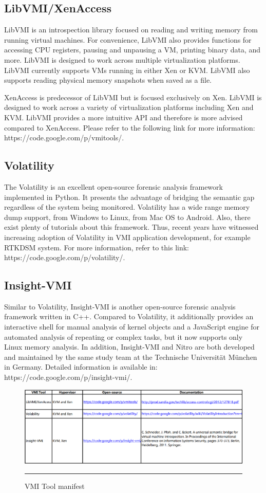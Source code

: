 \subsection{LibVMI/XenAccess  \cite{Reference10,Reference11}}

LibVMI is an introspection library focused on reading and writing memory from running virtual machines. For convenience, LibVMI also provides 
functions for accessing CPU registers, pausing and unpausing a VM, printing binary data, and more. LibVMI is designed to work across multiple 
virtualization platforms. LibVMI currently supports VMs running in either Xen or KVM. LibVMI also supports reading physical memory snapshots 
when saved as a file.

XenAccess is predecessor of LibVMI but is focused exclusively on Xen. LibVMI is designed to work across a variety of virtualization platforms
including Xen and KVM. LibVMI provides a more intuitive API and therefore is more advised compared to XenAccess. Please refer to the following
link for more information: https://code.google.com/p/vmitools/. 

\subsection{Volatility  \cite{Reference13}}

The Volatility is an excellent open-source forensic analysis framework implemented in Python. It presents the advantage of bridging the 
semantic gap regardless of the system being monitored. Volatility has a wide range memory dump support, from Windows to Linux, from Mac OS
to Android. Also, there exist plenty of tutorials about this framework. Thus, recent years have witnessed increasing adoption of Volatility
in VMI application development, for example RTKDSM system. For more information, refer to this link: https://code.google.com/p/volatility/.

\subsection{Insight-VMI  \cite{Reference14,Reference15}}

Similar to Volatility, Insight-VMI is another open-source forensic analysis framework written in C++. Compared to Volatility, it additionally
provides an interactive shell for manual analysis of kernel objects and a JavaScript engine for automated analysis of repeating or complex 
tasks, but it now supports only Linux memory analysis. In addition, Insight-VMI and Nitro are both developed and maintained by the same study
team at the Technische Universität München in Germany. Detailed information is available in: https://code.google.com/p/insight-vmi/.

\begin{figure}[htbp]
	\centering
		\includegraphics{Figures/Figure3.pdf}
		\rule{5em}{0.5pt}
	\caption[VMI Tool manifest]{VMI Tool manifest}
	\label{fig:VMI Tool manifest}
\end{figure}
